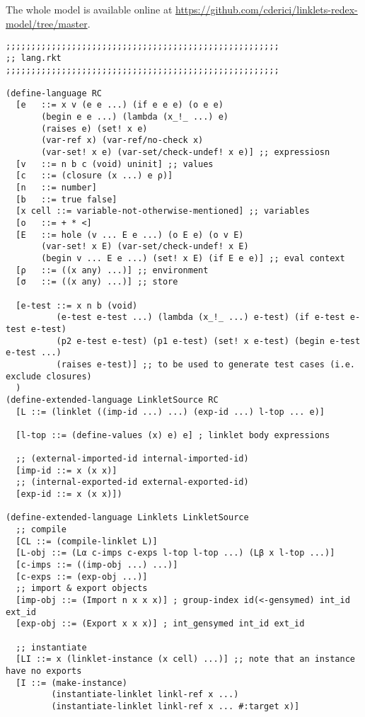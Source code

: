 The whole model is available online at \url{https://github.com/cderici/linklets-redex-model/tree/master}.

\begin{lstlisting}[language=pltredex,
                basicstyle=\ttfamily\scriptsize,
                numbers=none, xleftmargin=2em]
;;;;;;;;;;;;;;;;;;;;;;;;;;;;;;;;;;;;;;;;;;;;;;;;;;;;;;
;; lang.rkt
;;;;;;;;;;;;;;;;;;;;;;;;;;;;;;;;;;;;;;;;;;;;;;;;;;;;;;

(define-language RC
  [e   ::= x v (e e ...) (if e e e) (o e e)
       (begin e e ...) (lambda (x_!_ ...) e)
       (raises e) (set! x e)
       (var-ref x) (var-ref/no-check x)
       (var-set! x e) (var-set/check-undef! x e)] ;; expressiosn
  [v   ::= n b c (void) uninit] ;; values
  [c   ::= (closure (x ...) e ρ)]
  [n   ::= number]
  [b   ::= true false]
  [x cell ::= variable-not-otherwise-mentioned] ;; variables
  [o   ::= + * <]
  [E   ::= hole (v ... E e ...) (o E e) (o v E)
       (var-set! x E) (var-set/check-undef! x E)
       (begin v ... E e ...) (set! x E) (if E e e)] ;; eval context
  [ρ   ::= ((x any) ...)] ;; environment
  [σ   ::= ((x any) ...)] ;; store

  [e-test ::= x n b (void)
          (e-test e-test ...) (lambda (x_!_ ...) e-test) (if e-test e-test e-test)
          (p2 e-test e-test) (p1 e-test) (set! x e-test) (begin e-test e-test ...)
          (raises e-test)] ;; to be used to generate test cases (i.e. exclude closures)
  )
(define-extended-language LinkletSource RC
  [L ::= (linklet ((imp-id ...) ...) (exp-id ...) l-top ... e)]

  [l-top ::= (define-values (x) e) e] ; linklet body expressions

  ;; (external-imported-id internal-imported-id)
  [imp-id ::= x (x x)]
  ;; (internal-exported-id external-exported-id)
  [exp-id ::= x (x x)])

(define-extended-language Linklets LinkletSource
  ;; compile
  [CL ::= (compile-linklet L)]
  [L-obj ::= (Lα c-imps c-exps l-top l-top ...) (Lβ x l-top ...)]
  [c-imps ::= ((imp-obj ...) ...)]
  [c-exps ::= (exp-obj ...)]
  ;; import & export objects
  [imp-obj ::= (Import n x x x)] ; group-index id(<-gensymed) int_id ext_id
  [exp-obj ::= (Export x x x)] ; int_gensymed int_id ext_id

  ;; instantiate
  [LI ::= x (linklet-instance (x cell) ...)] ;; note that an instance have no exports
  [I ::= (make-instance)
         (instantiate-linklet linkl-ref x ...)
         (instantiate-linklet linkl-ref x ... #:target x)]


\end{lstlisting}
